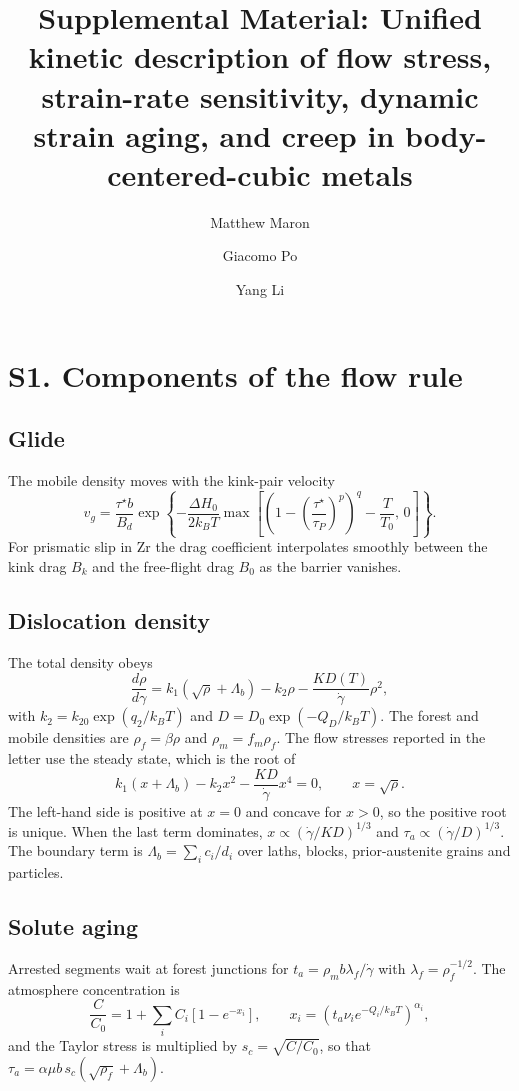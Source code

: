 \documentclass[aps,prl,onecolumn,superscriptaddress,amsmath,amssymb,floatfix]{revtex4-2}
\newcommand{\gd}{\dot\gamma}
\newcommand{\ts}{\tau^{\star}}
\newcommand{\kT}{k_BT}
\begin{document}
\title{Supplemental Material: Unified kinetic description of flow stress, strain-rate sensitivity, dynamic strain aging, and creep in body-centered-cubic metals}
\author{Matthew Maron}
\author{Giacomo Po}
\author{Yang Li}
\maketitle

\section{S1. Components of the flow rule}

\subsection{Glide}
The mobile density moves with the kink-pair velocity
\begin{equation}
v_g=\frac{\ts b}{B_d}\exp\left\{-\frac{\Delta H_0}{2\kT}\max\left[\left(1-\left(\frac{\ts}{\tau_P}\right)^p\right)^q-\frac{T}{T_0},\,0\right]\right\}.
\end{equation}
For prismatic slip in Zr the drag coefficient interpolates smoothly between the kink drag $B_k$ and the free-flight drag $B_0$ as the barrier vanishes.

\subsection{Dislocation density}
The total density obeys
\begin{equation}
\frac{d\rho}{d\gamma}=k_1(\sqrt\rho+\Lambda_b)-k_2\rho-\frac{K D(T)}{\gd}\rho^2,
\end{equation}
with $k_2=k_{20}\exp(q_2/\kT)$ and $D=D_0\exp(-Q_D/\kT)$. The forest and mobile densities are $\rho_f=\beta\rho$ and $\rho_m=f_m\rho_f$. The flow stresses reported in the letter use the steady state, which is the root of
\begin{equation}
k_1(x+\Lambda_b)-k_2x^2-\frac{K D}{\gd}x^4=0,\qquad x=\sqrt\rho .
\end{equation}
The left-hand side is positive at $x=0$ and concave for $x>0$, so the positive root is unique. When the last term dominates, $x\propto(\gd/KD)^{1/3}$ and $\tau_a\propto(\gd/D)^{1/3}$. The boundary term is $\Lambda_b=\sum_ic_i/d_i$ over laths, blocks, prior-austenite grains and particles.

\subsection{Solute aging}
Arrested segments wait at forest junctions for $t_a=\rho_mb\lambda_f/\gd$ with $\lambda_f=\rho_f^{-1/2}$. The atmosphere concentration is
\begin{equation}
\frac{C}{C_0}=1+\sum_iC_i\left[1-e^{-x_i}\right],\qquad x_i=\left(t_a\nu_ie^{-Q_i/\kT}\right)^{\alpha_i},
\end{equation}
and the Taylor stress is multiplied by $s_c=\sqrt{C/C_0}$, so that $\tau_a=\alpha\mu b\,s_c(\sqrt{\rho_f}+\Lambda_b)$.
\end{document}
